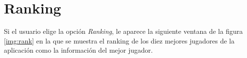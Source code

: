 \section{Ranking}
Si el usuario elige la opción \emph{Ranking}, le aparece la siguiente ventana de
la figura \ref{img:rank} en la que se muestra el ranking de los diez mejores 
jugadores de la aplicación como la información del mejor jugador.\\



